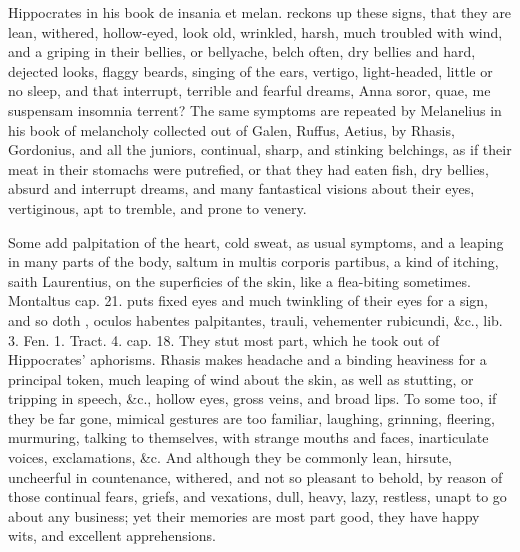 {Hippocrates in his book de insania et melan. reckons up these
signs, that they are  lean, withered, hollow-eyed, look old,
wrinkled, harsh, much troubled with wind, and a griping in their
bellies, or bellyache, belch often, dry bellies and hard, dejected
looks, flaggy beards, singing of the ears, vertigo, light-headed,
little or no sleep, and that interrupt, terrible and fearful dreams,
Anna soror, quae, me suspensam insomnia terrent? The same
symptoms are repeated by Melanelius in his book of melancholy collected
out of Galen, Ruffus, Aetius, by Rhasis, Gordonius, and all the
juniors, continual, sharp, and stinking belchings, as if their
meat in their stomachs were putrefied, or that they had eaten fish, dry
bellies, absurd and interrupt dreams, and many fantastical visions
about their eyes, vertiginous, apt to tremble, and prone to venery.

Some add palpitation of the heart, cold sweat, as usual symptoms,
and a leaping in many parts of the body, saltum in multis corporis
partibus, a kind of itching, saith Laurentius, on the superficies of
the skin, like a flea-biting sometimes. Montaltus cap. 21. puts
fixed eyes and much twinkling of their eyes for a sign, and so doth
\Avicenna{}, oculos habentes palpitantes, trauli, vehementer rubicundi,
\&c., lib. 3. Fen. 1. Tract. 4. cap. 18. They stut most part, which he
took out of Hippocrates' aphorisms. Rhasis makes headache and a
binding heaviness for a principal token, much leaping of wind about the
skin, as well as stutting, or tripping in speech, \&c., hollow eyes,
gross veins, and broad lips. To some too, if they be far gone, mimical
gestures are too familiar, laughing, grinning, fleering, murmuring,
talking to themselves, with strange mouths and faces, inarticulate
voices, exclamations, \&c. And although they be commonly lean, hirsute,
uncheerful in countenance, withered, and not so pleasant to behold, by
reason of those continual fears, griefs, and vexations, dull, heavy,
lazy, restless, unapt to go about any business; yet their memories are
most part good, they have happy wits, and excellent apprehensions.

}
